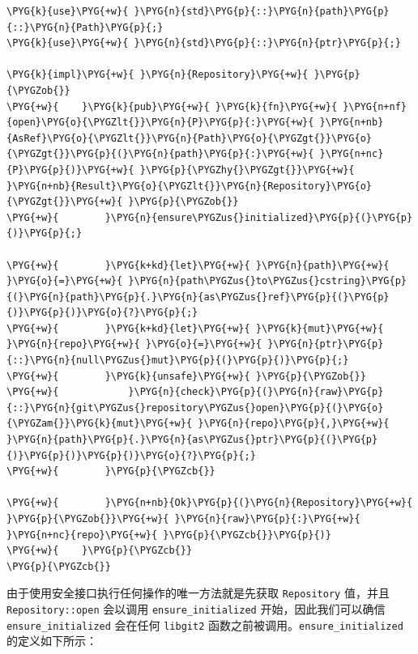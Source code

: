 \begin{Verbatim}[commandchars=\\\{\},breaklines=true,breakanywhere=true,fontsize=\codefont,xleftmargin=17bp]
\PYG{k}{use}\PYG{+w}{ }\PYG{n}{std}\PYG{p}{::}\PYG{n}{path}\PYG{p}{::}\PYG{n}{Path}\PYG{p}{;}
\PYG{k}{use}\PYG{+w}{ }\PYG{n}{std}\PYG{p}{::}\PYG{n}{ptr}\PYG{p}{;}

\PYG{k}{impl}\PYG{+w}{ }\PYG{n}{Repository}\PYG{+w}{ }\PYG{p}{\PYGZob{}}
\PYG{+w}{    }\PYG{k}{pub}\PYG{+w}{ }\PYG{k}{fn}\PYG{+w}{ }\PYG{n+nf}{open}\PYG{o}{\PYGZlt{}}\PYG{n}{P}\PYG{p}{:}\PYG{+w}{ }\PYG{n+nb}{AsRef}\PYG{o}{\PYGZlt{}}\PYG{n}{Path}\PYG{o}{\PYGZgt{}}\PYG{o}{\PYGZgt{}}\PYG{p}{(}\PYG{n}{path}\PYG{p}{:}\PYG{+w}{ }\PYG{n+nc}{P}\PYG{p}{)}\PYG{+w}{ }\PYG{p}{\PYGZhy{}\PYGZgt{}}\PYG{+w}{ }\PYG{n+nb}{Result}\PYG{o}{\PYGZlt{}}\PYG{n}{Repository}\PYG{o}{\PYGZgt{}}\PYG{+w}{ }\PYG{p}{\PYGZob{}}
\PYG{+w}{        }\PYG{n}{ensure\PYGZus{}initialized}\PYG{p}{(}\PYG{p}{)}\PYG{p}{;}

\PYG{+w}{        }\PYG{k+kd}{let}\PYG{+w}{ }\PYG{n}{path}\PYG{+w}{ }\PYG{o}{=}\PYG{+w}{ }\PYG{n}{path\PYGZus{}to\PYGZus{}cstring}\PYG{p}{(}\PYG{n}{path}\PYG{p}{.}\PYG{n}{as\PYGZus{}ref}\PYG{p}{(}\PYG{p}{)}\PYG{p}{)}\PYG{o}{?}\PYG{p}{;}
\PYG{+w}{        }\PYG{k+kd}{let}\PYG{+w}{ }\PYG{k}{mut}\PYG{+w}{ }\PYG{n}{repo}\PYG{+w}{ }\PYG{o}{=}\PYG{+w}{ }\PYG{n}{ptr}\PYG{p}{::}\PYG{n}{null\PYGZus{}mut}\PYG{p}{(}\PYG{p}{)}\PYG{p}{;}
\PYG{+w}{        }\PYG{k}{unsafe}\PYG{+w}{ }\PYG{p}{\PYGZob{}}
\PYG{+w}{            }\PYG{n}{check}\PYG{p}{(}\PYG{n}{raw}\PYG{p}{::}\PYG{n}{git\PYGZus{}repository\PYGZus{}open}\PYG{p}{(}\PYG{o}{\PYGZam{}}\PYG{k}{mut}\PYG{+w}{ }\PYG{n}{repo}\PYG{p}{,}\PYG{+w}{ }\PYG{n}{path}\PYG{p}{.}\PYG{n}{as\PYGZus{}ptr}\PYG{p}{(}\PYG{p}{)}\PYG{p}{)}\PYG{p}{)}\PYG{o}{?}\PYG{p}{;}
\PYG{+w}{        }\PYG{p}{\PYGZcb{}}

\PYG{+w}{        }\PYG{n+nb}{Ok}\PYG{p}{(}\PYG{n}{Repository}\PYG{+w}{ }\PYG{p}{\PYGZob{}}\PYG{+w}{ }\PYG{n}{raw}\PYG{p}{:}\PYG{+w}{ }\PYG{n+nc}{repo}\PYG{+w}{ }\PYG{p}{\PYGZcb{}}\PYG{p}{)}
\PYG{+w}{    }\PYG{p}{\PYGZcb{}}
\PYG{p}{\PYGZcb{}}
\end{Verbatim}

由于使用安全接口执行任何操作的唯一方法就是先获取 \texttt{Repository} 值，并且 \texttt{Repository::open} 会以调用 \texttt{ensure\_initialized} 开始，因此我们可以确信 \texttt{ensure\_initialized} 会在任何 \texttt{libgit2} 函数之前被调用。\texttt{ensure\_initialized} 的定义如下所示：

